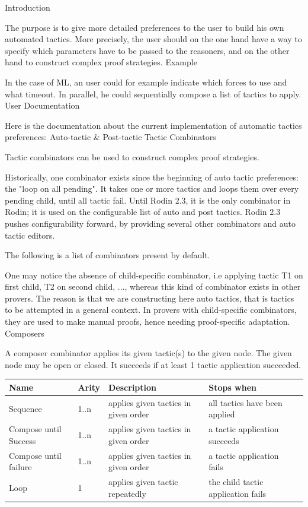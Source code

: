 
Introduction

The purpose is to give more detailed preferences to the user to build his own automated tactics. More precisely, the user should on the one hand have a way to specify which parameters have to be passed to the reasoners, and on the other hand to construct complex proof strategies.
Example

In the case of ML, an user could for example indicate which forces to use and what timeout. In parallel, he could sequentially compose a list of tactics to apply.
User Documentation

Here is the documentation about the current implementation of automatic tactics preferences: Auto-tactic \& Post-tactic
Tactic Combinators

Tactic combinators can be used to construct complex proof strategies.

Historically, one combinator exists since the beginning of auto tactic preferences: the "loop on all pending". It takes one or more tactics and loops them over every pending child, until all tactic fail. Until Rodin 2.3, it is the only combinator in Rodin; it is used on the configurable list of auto and post tactics. Rodin 2.3 pushes configurability forward, by providing several other combinators and auto tactic editors.

The following is a list of combinators present by default.

One may notice the absence of child-specific combinator, i.e applying tactic T1 on first child, T2 on second child, ..., whereas this kind of combinator exists in other provers. The reason is that we are constructing here auto tactics, that is tactics to be attempted in a general context. In provers with child-specific combinators, they are used to make manual proofs, hence needing proof-specific adaptation.
Composers

A composer combinator applies its given tactic(s) to the given node. The given node may be open or closed. It succeeds if at least 1 tactic application succeeded. 

\begin{center}
    \begin{tabular}{ | l | l | l | l | p{5cm} |}
    \hline
	Name & Arity & Description & Stops when  \\ \hline
	Sequence & 1..n  & applies given tactics in given order & all tactics have been applied  \\ \hline
	Compose until Success & 1..n  & applies given tactics in given order & a tactic application succeeds \\ \hline
	Compose until failure  & 1..n  & applies given tactics in given order & a tactic application fails \\ \hline
	Loop & 1 & applies given tactic repeatedly & the child tactic application fails \\ \hline
    \end{tabular}
\end{center}

